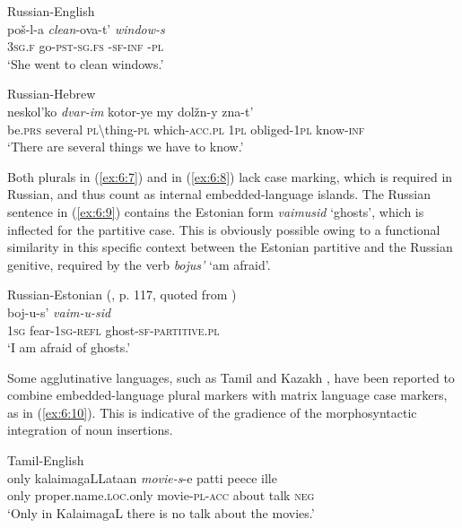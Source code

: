\ea
\label{ex:6:7}
Russian-English \citep[173]{benson}\\
 {poš-l-a} \textit{clean}-ova-t' \textit{window-s}\\
	\textsc{3sg.f} go-\textsc{pst-sg.fs} \phantom{mmn}-\textsc{sf-inf} \phantom{mmmm}-\textsc{pl}\\
\glt `She went to clean windows.'
\z

\ea
\label{ex:6:8}
Russian-Hebrew \citep[48]{naiditch08}\\
 {neskol'ko} \textit{dvar-im} {kotor-ye} {my} {dolžn-y} {zna-t'}\\
	be.\textsc{prs} several \textsc{pl}\textbackslash thing-\textsc{pl} which-\textsc{acc.pl} \textsc{1pl} obliged-\textsc{1pl} know-\textsc{inf}\\
\glt `There are several things we have to know.'
\z

\noindent Both plurals in (\ref{ex:6:7}) and in (\ref{ex:6:8}) lack case marking, which is required in Russian, and thus count as internal embedded-language islands. The Russian sentence in (\ref{ex:6:9}) contains the Estonian form \textit{vaimusid} ‘ghosts’, which is inflected for the partitive case. This is obviously possible owing to a functional similarity in this specific context between the Estonian partitive and the Russian genitive, required by the verb \textit{bojus’} ‘am afraid’.

\ea
\label{ex:6:9}
Russian-Estonian (\citealt{muerkhein}, p. 117, quoted from \citealt[437]{verschik04})\\
 {boj-u-s'} \textit{vaim-u-sid}\\
	\textsc{1sg} fear-\textsc{1sg-refl} ghost-\textsc{sf-partitive.pl}\\
\glt `I am afraid of ghosts.'
\z

Some agglutinative languages, such as Tamil and Kazakh \citep[67]{muhamedowa-untersuchung-2006}, have been reported to combine  embedded-language plural markers with matrix language case markers, as in (\ref{ex:6:10}). This is indicative of the gradience of the morphosyntactic integration of noun insertions.

\ea
\label{ex:6:10}
Tamil-English \citep[81]{sankoff-et-al-1990}\\
\gll only {kalaimagaLLataan} \textit{movie-s}-e {patti} {peece} {ille}\\
	only proper.name.\textsc{loc}.only movie-\textsc{pl-acc} about talk \textsc{neg}\\
\glt `Only in KalaimagaL there is no talk about the movies.'
\z

